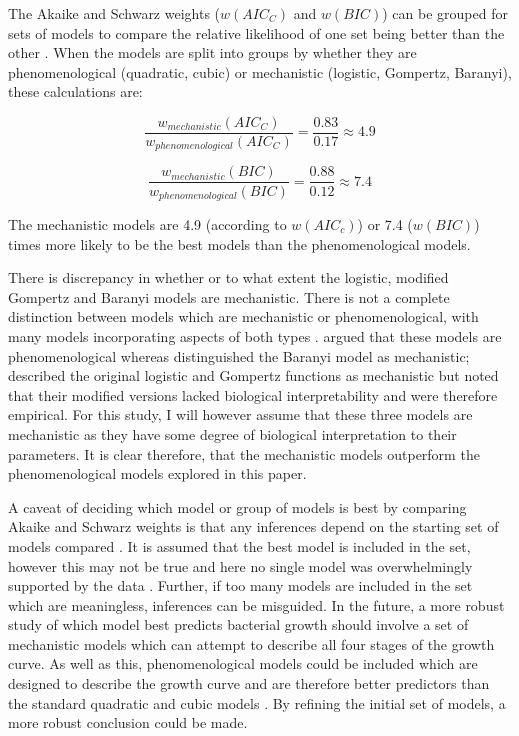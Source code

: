 \documentclass[11pt]{article}
\begin{document}
\begin{linenumbers}
        The Akaike and Schwarz weights ($w(AIC_C)$ and $w(BIC)$) can be grouped for sets of models to compare the relative likelihood of one set being better than the other \citep{wagenmakers_aic_2004}. When the models are split into groups by whether they are phenomenological (quadratic, cubic) or mechanistic (logistic, Gompertz, Baranyi), these calculations are:
        
        \begin{equation}
            \frac{w_{mechanistic}(AIC_C)}{w_{phenomenological}(AIC_C)} = \frac{0.83}{0.17} \approx 4.9 
        \end{equation}
        
        \begin{equation}
            \frac{w_{mechanistic}(BIC)}{w_{phenomenological}(BIC)} = \frac{0.88}{0.12} \approx 7.4
        \end{equation}
        
        The mechanistic models are 4.9 (according to $w(AIC_c)$) or 7.4 ($w(BIC)$) times more likely to be the best models than the phenomenological models. 
        
        There is discrepancy in whether or to what extent the logistic, modified Gompertz and Baranyi models are mechanistic. There is not a complete distinction between models which are mechanistic or phenomenological, with many models incorporating aspects of both types \citep{ferrer_mathematical_2009}. \cite{peleg_modeling_1997} argued that these models are phenomenological whereas \cite{ferrer_mathematical_2009} distinguished the Baranyi model as mechanistic; \cite{mckellar_primary_2003} described the original logistic and Gompertz functions as mechanistic but noted that their modified versions lacked biological interpretability and were therefore empirical. For this study, I will however assume that these three models are mechanistic as they have some degree of biological interpretation to their parameters. It is clear therefore, that the mechanistic models outperform the phenomenological models explored in this paper. 
        
        A caveat of deciding which model or group of models is best by comparing Akaike and Schwarz weights is that any inferences depend on the starting set of models compared \citep{johnson_model_2004}. It is assumed that the best model is included in the set, however this may not be true and here no single model was overwhelmingly supported by the data \citep{buchanan_when_1997}. Further, if too many models are included in the set which are meaningless, inferences can be misguided. In the future, a more robust study of which model best predicts bacterial growth should involve a set of mechanistic models which can attempt to describe all four stages of the growth curve. As well as this, phenomenological models could be included which are designed to describe the growth curve and are therefore better predictors than the standard quadratic and cubic models \citep[e.g.][]{salazar_primary_2021}. By refining the initial set of models, a more robust conclusion could be made.
        

\end{linenumbers}
\end{document}
